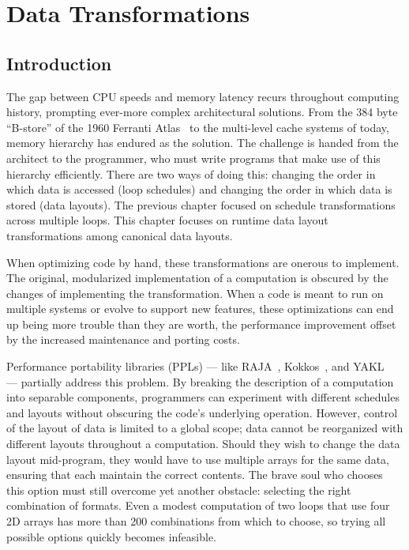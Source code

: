 \chapter{Data Transformations}\label{chap:FormatDecisions}

\section{Introduction}

The gap between CPU speeds and memory latency recurs throughout computing history, prompting ever-more complex architectural solutions.
From the 384 byte ``B-store'' of the 1960 Ferranti Atlas~\cite{ferranti1960features} to the multi-level cache systems of today, memory hierarchy has endured as the solution.
The challenge is handed from the architect to the programmer, who must write programs that make use of this hierarchy efficiently.
There are two ways of doing this: changing the order in which data is accessed (loop schedules) and changing the order in which data is stored (data layouts).
The previous chapter focused on schedule transformations across multiple loops. 
This chapter focuses on runtime data layout transformations among canonical data layouts.

When optimizing code by hand, these transformations are onerous to implement.
The original, modularized implementation of a computation is obscured by the changes of implementing the transformation. 
When a code is meant to run on multiple systems or evolve to support new features, these optimizations can end up being more trouble than they are worth, the performance improvement offset by the increased maintenance and porting costs.

Performance portability libraries (PPLs) --- like RAJA~\cite{hornung2014RAJA}, Kokkos~\cite{edwards2014kokkos}, and YAKL~\cite{norman2022portable} --- partially address this problem.
By breaking the description of a computation into separable components, programmers can experiment with different schedules and layouts without obscuring the code's underlying operation.
However, control of the layout of data is limited to a global scope; data cannot be reorganized with different layouts throughout a computation.
Should they wish to change the data layout mid-program, they would have to use multiple arrays for the same data, ensuring that each maintain the correct contents.
The brave soul who chooses this option must still overcome yet another obstacle: selecting the right combination of formats.
Even a modest computation of two loops that use four 2D arrays has more than 200 combinations from which to choose, so trying all possible options quickly becomes infeasible. 

